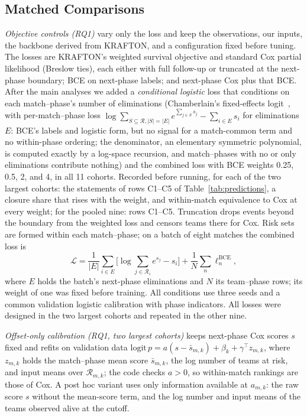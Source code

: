 \documentclass[sigconf,anonymous]{acmart}
\begin{document}
\subsection{Matched Comparisons}
\label{sec:method:decomposition}
\emph{Objective controls (RQ1)} vary only the loss and keep the observations, our inputs, the backbone derived from KRAFTON, and a configuration fixed before tuning. The losses are KRAFTON's weighted survival objective and standard Cox partial likelihood (Breslow ties), each either with full follow-up or truncated at the next-phase boundary; BCE on next-phase labels; and next-phase Cox plus that BCE. After the main analyses we added a \emph{conditional logistic} loss that conditions on each match--phase's number of eliminations (Chamberlain's fixed-effects logit~\cite{Chamberlain80}, with per-match--phase loss $\log\sum_{S\subseteq\mathcal{R},|S|=|E|}e^{\sum_{j\in S}s_j}-\sum_{i\in E}s_i$ for eliminations $E$: BCE's labels and logistic form, but no signal for a match-common term and no within-phase ordering; the denominator, an elementary symmetric polynomial, is computed exactly by a log-space recursion, and match--phases with no or only eliminations contribute nothing) and the combined loss with BCE weights 0.25, 0.5, 2, and 4, in all 11 cohorts. Recorded before running, for each of the two largest cohorts: the statements of rows C1--C5 of Table~\ref{tab:predictions}, a closure share that rises with the weight, and within-match equivalence to Cox at every weight; for the pooled nine: rows C1--C5. Truncation drops events beyond the boundary from the weighted loss and censors teams there for Cox. Risk sets are formed within each match--phase; on a batch of eight matches the combined loss is
\begin{equation}
\mathcal{L}=\frac{1}{|E|}\sum_{i\in E}\Big[\log\sum_{j\in\mathcal{R}_i}e^{s_j}-s_i\Big]+\frac{1}{N}\sum_{n}\ell^{\mathrm{BCE}}_n,
\label{eq:combined}
\end{equation}
where $E$ holds the batch's next-phase eliminations and $N$ its team--phase rows; its weight of one was fixed before training. All conditions use three seeds and a common validation logistic calibration with phase indicators. All losses were designed in the two largest cohorts and repeated in the other nine.

\emph{Offset-only calibration (RQ1, two largest cohorts)} keeps next-phase Cox scores $s$ fixed and refits on validation data $\mathrm{logit}\,p=a(s-\bar s_{m,k})+\beta_k+\gamma^{\top}z_{m,k}$, where $z_{m,k}$ holds the match--phase mean score $\bar s_{m,k}$, the log number of teams at risk, and input means over $\mathcal{R}_{m,k}$; the code checks $a>0$, so within-match rankings are those of Cox. A post hoc variant uses only information available at $a_{m,k}$: the raw score $s$ without the mean-score term, and the log number and input means of the teams observed alive at the cutoff.
\end{document}
